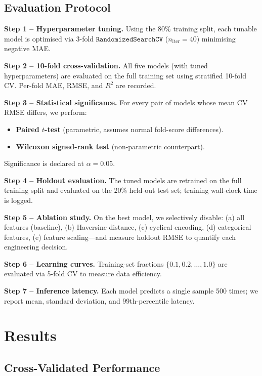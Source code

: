 \documentclass[conference]{IEEEtran}
\begin{document}
\subsection{Evaluation Protocol}
\label{sec:eval}

\textbf{Step 1 – Hyperparameter tuning.}
Using the 80\% training split, each tunable model is optimised via 3-fold
$\texttt{RandomizedSearchCV}$ ($n_{\text{iter}}=40$) minimising negative MAE.

\textbf{Step 2 – 10-fold cross-validation.}
All five models (with tuned hyperparameters) are evaluated on the full training
set using stratified 10-fold CV.  Per-fold MAE, RMSE, and $R^2$ are recorded.

\textbf{Step 3 – Statistical significance.}
For every pair of models whose mean CV RMSE differs, we perform:
\begin{itemize}
    \item \textbf{Paired $t$-test} (parametric, assumes normal fold-score
          differences).
    \item \textbf{Wilcoxon signed-rank test} (non-parametric counterpart).
\end{itemize}
Significance is declared at $\alpha = 0.05$.

\textbf{Step 4 – Holdout evaluation.}
The tuned models are retrained on the full training split and evaluated on the
20\% held-out test set; training wall-clock time is logged.

\textbf{Step 5 – Ablation study.}
On the best model, we selectively disable:
(a) all features (baseline), (b) Haversine distance, (c) cyclical encoding,
(d) categorical features, (e) feature scaling—and measure holdout RMSE to
quantify each engineering decision.

\textbf{Step 6 – Learning curves.}
Training-set fractions $\{0.1, 0.2, \ldots, 1.0\}$ are evaluated via 5-fold
CV to measure data efficiency.

\textbf{Step 7 – Inference latency.}
Each model predicts a single sample 500 times; we report mean, standard
deviation, and 99th-percentile latency.

\section{Results}
\label{sec:results}

\subsection{Cross-Validated Performance}
\end{document}
